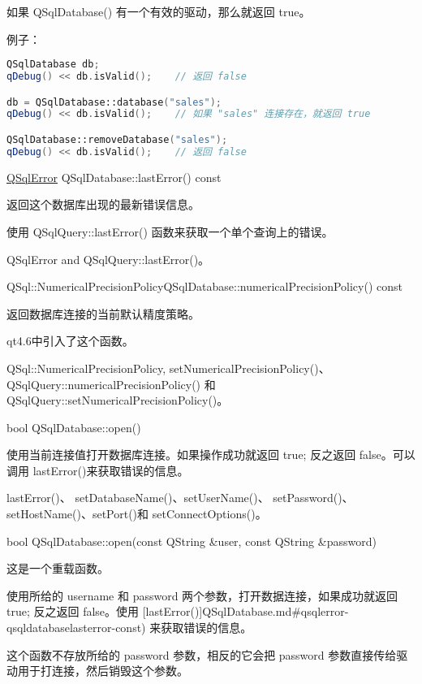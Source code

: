 如果 QSqlDatabase() 有一个有效的驱动，那么就返回 true。

例子：

\begin{lstlisting}[language=C++]
QSqlDatabase db;
qDebug() << db.isValid();    // 返回 false

db = QSqlDatabase::database("sales");
qDebug() << db.isValid();    // 如果 "sales" 连接存在，就返回 true

QSqlDatabase::removeDatabase("sales");
qDebug() << db.isValid();    // 返回 false
\end{lstlisting}

\href{https://doc.qt.io/qt-5/qsqlerror.html}{QSqlError} QSqlDatabase::lastError() const

返回这个数据库出现的最新错误信息。

使用 QSqlQuery::lastError() 函数来获取一个单个查询上的错误。

\begin{seeAlso}
QSqlError and QSqlQuery::lastError()。
\end{seeAlso}


QSql::NumericalPrecisionPolicyQSqlDatabase::numericalPrecisionPolicy() const

返回数据库连接的当前默认精度策略。

qt4.6中引入了这个函数。

\begin{seeAlso}
QSql::NumericalPrecisionPolicy, setNumericalPrecisionPolicy()、
QSqlQuery::numericalPrecisionPolicy() 和 QSqlQuery::setNumericalPrecisionPolicy()。
\end{seeAlso}

bool QSqlDatabase::open()

使用当前连接值打开数据库连接。如果操作成功就返回 true; 反之返回 false。可以调用 lastError()来获取错误的信息。

\begin{seeAlso}
lastError()、 setDatabaseName()、setUserName()、
setPassword()、setHostName()、setPort()和 setConnectOptions()。
\end{seeAlso}

bool QSqlDatabase::open(const QString \&user, const QString \&password)

这是一个重载函数。

使用所给的 username 和 password 两个参数，打开数据连接，如果成功就返回 true; 反之返回 false。使用 [lastError()]QSqlDatabase.md\#qsqlerror-qsqldatabaselasterror-const) 来获取错误的信息。

这个函数不存放所给的 password 参数，相反的它会把 password 参数直接传给驱动用于打连接，然后销毁这个参数。

